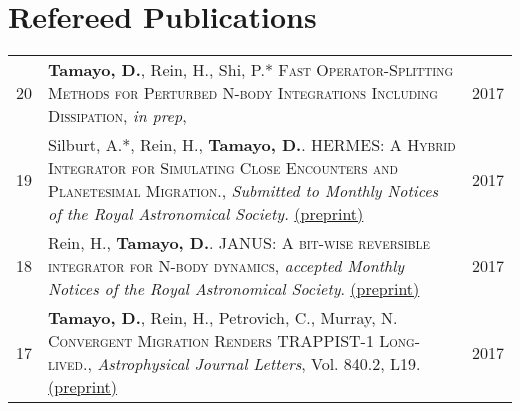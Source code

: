 \documentclass[10pt]{article} %
\begin{document}
{%



\section{Refereed Publications}

\begin{tabular}{>{\hfill}r|p{14.3cm}l}
20 & {\bf Tamayo, D.}, Rein, H., Shi, P.* \textsc{Fast Operator-Splitting Methods for Perturbed N-body Integrations Including Dissipation}, {\it in prep}, & 2017 \\

19 & Silburt, A.*, Rein, H., {\bf Tamayo, D.}. \textsc{HERMES: A Hybrid Integrator for Simulating Close Encounters and Planetesimal Migration.}, {\it Submitted to Monthly Notices of the Royal Astronomical Society.} \href{http://cita.utoronto.ca/~dtamayo/hermes.pdf}{(preprint)} & 2017 \\

18 & Rein, H., {\bf Tamayo, D.}. \textsc{JANUS: A bit-wise reversible integrator for N-body dynamics}, {\it accepted Monthly Notices of the Royal Astronomical Society}. \href{https://arxiv.org/abs/1704.07715}{(preprint)} & 2017 \\

17 & {\bf Tamayo, D.}, Rein, H., Petrovich, C., Murray, N. \textsc{Convergent Migration Renders TRAPPIST-1 Long-lived.}, {\it Astrophysical Journal Letters}, Vol. 840.2, L19. \href{https://arxiv.org/abs/1704.02957}{(preprint)} & 2017 \\


\end{tabular}}
\end{document}

